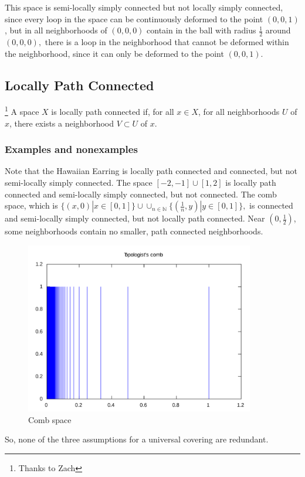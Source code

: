 \documentclass{article}
\theoremstyle{definition}
\begin{document}
This space is semi-locally simply connected but not locally simply connected, since every loop in the space can be continuously deformed to the point $(0, 0, 1)$, but in all neighborhoods of $(0, 0, 0)$ contain in the ball with radius $\frac{1}{2}$ around $(0, 0, 0),$ there is a loop in the neighborhood that cannot be deformed within the neighborhood, since it can only be deformed to the point $(0, 0, 1).$

\subsection{Locally Path Connected}\footnote{Thanks to Zach}
A space $X$ is locally path connected if, for all $x\in X$, for all neighborhoods $U$ of $x$, there exists a neighborhood $V\subset U$ of $x$.
\subsubsection{Examples and nonexamples}
Note that the Hawaiian Earring is locally path connected and connected, but not semi-locally simply connected. The space $[-2, -1]\cup [1, 2]$ is locally path connected and semi-locally simply connected, but not connected. The comb space, which is $\{(x, 0) |x\in [0, 1]\}\cup \cup_{n\in \mathbb{N}} \{(\frac{1}{n}, y)|y\in [0, 1]\},$ is connected and semi-locally simply connected, but not locally path connected. Near $(0, \frac{1}{2})$, some neighborhoods contain no smaller, path connected neighborhoods.
\begin{figure}[H]
\centering
\includegraphics[width=10cm]{images/m4_comb.png}
\caption{\small{Comb space}}
\label{img:m4_combspace}
\end{figure}
So, none of the three assumptions for a universal covering are redundant.
\end{document}
